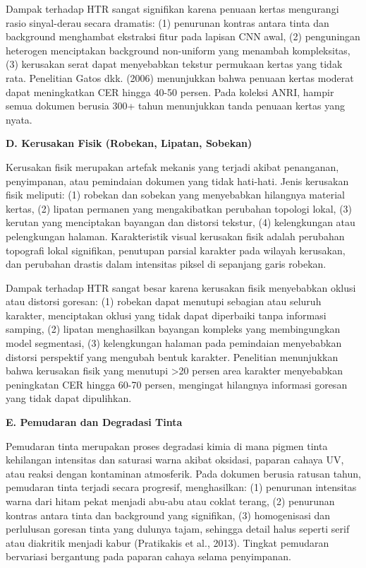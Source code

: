 \documentclass[12pt,a4paper]{article}
\begin{document}
Dampak terhadap HTR sangat signifikan karena penuaan kertas mengurangi rasio sinyal-derau secara dramatis: (1) penurunan kontras antara tinta dan background menghambat ekstraksi fitur pada lapisan CNN awal, (2) penguningan heterogen menciptakan background non-uniform yang menambah kompleksitas, (3) kerusakan serat dapat menyebabkan tekstur permukaan kertas yang tidak rata. Penelitian Gatos dkk. (2006) menunjukkan bahwa penuaan kertas moderat dapat meningkatkan CER hingga 40-50 persen. Pada koleksi ANRI, hampir semua dokumen berusia 300+ tahun menunjukkan tanda penuaan kertas yang nyata.

\vspace{0.5ex}
\noindent\textbf{D. Kerusakan Fisik (Robekan, Lipatan, Sobekan)}

Kerusakan fisik merupakan artefak mekanis yang terjadi akibat penanganan, penyimpanan, atau pemindaian dokumen yang tidak hati-hati. Jenis kerusakan fisik meliputi: (1) robekan dan sobekan yang menyebabkan hilangnya material kertas, (2) lipatan permanen yang mengakibatkan perubahan topologi lokal, (3) kerutan yang menciptakan bayangan dan distorsi tekstur, (4) kelengkungan atau pelengkungan halaman. Karakteristik visual kerusakan fisik adalah perubahan topografi lokal signifikan, penutupan parsial karakter pada wilayah kerusakan, dan perubahan drastis dalam intensitas piksel di sepanjang garis robekan.

Dampak terhadap HTR sangat besar karena kerusakan fisik menyebabkan oklusi atau distorsi goresan: (1) robekan dapat menutupi sebagian atau seluruh karakter, menciptakan oklusi yang tidak dapat diperbaiki tanpa informasi samping, (2) lipatan menghasilkan bayangan kompleks yang membingungkan model segmentasi, (3) kelengkungan halaman pada pemindaian menyebabkan distorsi perspektif yang mengubah bentuk karakter. Penelitian menunjukkan bahwa kerusakan fisik yang menutupi >20 persen area karakter menyebabkan peningkatan CER hingga 60-70 persen, mengingat hilangnya informasi goresan yang tidak dapat dipulihkan.

\vspace{0.5ex}
\noindent\textbf{E. Pemudaran dan Degradasi Tinta}

Pemudaran tinta merupakan proses degradasi kimia di mana pigmen tinta kehilangan intensitas dan saturasi warna akibat oksidasi, paparan cahaya UV, atau reaksi dengan kontaminan atmosferik. Pada dokumen berusia ratusan tahun, pemudaran tinta terjadi secara progresif, menghasilkan: (1) penurunan intensitas warna dari hitam pekat menjadi abu-abu atau coklat terang, (2) penurunan kontras antara tinta dan background yang signifikan, (3) homogenisasi dan perlulusan goresan tinta yang dulunya tajam, sehingga detail halus seperti serif atau diakritik menjadi kabur (Pratikakis et al., 2013). Tingkat pemudaran bervariasi bergantung pada paparan cahaya selama penyimpanan.
\end{document}
